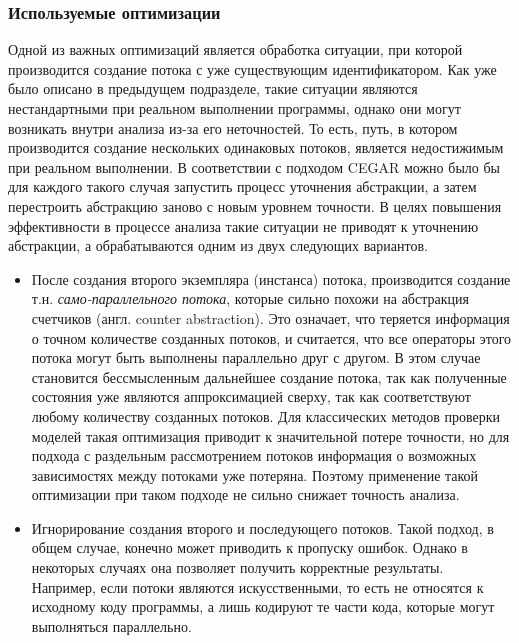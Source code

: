 \subsubsection{Используемые оптимизации}

Одной из важных оптимизаций является обработка ситуации, при которой производится создание потока с уже существующим идентификатором. 
Как уже было описано в предыдущем подразделе, такие ситуации являются нестандартными при реальном выполнении программы, однако они могут возникать внутри анализа из-за его неточностей.
То есть, путь, в котором производится создание нескольких одинаковых потоков, является недостижимым при реальном выполнении.
В соответствии с подходом CEGAR можно было бы для каждого такого случая запустить процесс уточнения абстракции, а затем перестроить абстракцию заново с новым уровнем точности.
В целях повышения эффективности в процессе анализа такие ситуации не приводят к уточнению абстракции, а обрабатываются одним из двух следующих вариантов.

\begin{itemize}
\item После создания второго экземпляра (инстанса) потока, производится создание т.н. \textit{само-параллельного потока}, которые сильно похожи на абстракция счетчиков (англ. counter abstraction).
Это означает, что теряется информация о точном количестве созданных потоков, и считается, что все операторы этого потока могут быть выполнены параллельно друг с другом.
В этом случае становится бессмысленным дальнейшее создание потока, так как полученные состояния уже являются аппроксимацией сверху, так как соответствуют любому количеству созданных потоков.
Для классических методов проверки моделей такая оптимизация приводит к значительной потере точности, но для подхода с раздельным рассмотрением потоков информация о возможных зависимостях между потоками уже потеряна.
Поэтому применение такой оптимизации при таком подходе не сильно снижает точность анализа.

\item Игнорирование создания второго и последующего потоков. 
Такой подход, в общем случае, конечно может приводить к пропуску ошибок. 
Однако в некоторых случаях она позволяет получить корректные результаты.
Например, если потоки являются искусственными, то есть не относятся к исходному коду программы, а лишь кодируют те части кода, которые могут выполняться параллельно.

\end{itemize}


